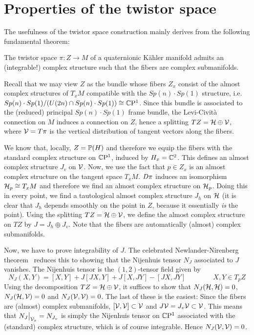 \section{Properties of the twistor space}

The usefulness of the twistor space construction mainly derives from the following fundamental theorem:

\begin{thm}\label{thm:twistorcpx}
	The twistor space $\pi: Z\to M$ of a quaternionic K\"ahler manifold admits an (integrable!) complex structure such that the fibers are complex submanifolds.
\end{thm}
\begin{myproof}
	Recall that we may view $Z$ as the bundle whose fibers $Z_x$ consist of the almost complex structures of $T_xM$ compatible with the $Sp(n)\cdot Sp(1)$ structure, i.e.~$Sp(n)\cdot Sp(1)/(U(2n)\cap Sp(n)\cdot Sp(1))\cong \CP^1$. Since this bundle is associated to the (reduced) principal $Sp(n)\cdot Sp(1)$ frame bundle, the Levi-Civit\`a connection on $M$ induces a connection on $Z$, hence a splitting $TZ=\mc H\oplus \mc V$, where $\mc V=T\pi$ is the vertical distribution of tangent vectors along the fibers. 
	
	We know that, locally, $Z=\P(H)$ and therefore we equip the fibers with the standard complex structure on $\CP^1$, induced by $H_x=\C^2$. This defines an almost complex structure $J_v$ on $\mc V$. Now, we use the fact that $p\in Z_x$ is an almost complex structure on the tangent space $T_xM$. $\dif\pi$ induces an isomorphism $\mc H_p\cong T_xM$ and therefore we find an almost complex structure on $\mc H_p$. Doing this in every point, we find a tautological almost complex structure $J_h$ on $\mc H$ (it is clear that $J_h$ depends smoothly on the point in $Z$, because it essentially \emph{is} the point). Using the splitting $TZ=\mc H\oplus \mc V$, we define the almost complex structure on $TZ$ by $J=J_h\oplus J_v$. Note that the fibers are automatically (almost) complex submanifolds.
	
	Now, we have to prove integrability of $J$. The celebrated Newlander-Nirenberg theorem~\cite{NN1957} reduces this to showing that the Nijenhuis tensor $N_J$ associated to $J$ vanishes. The Nijenhuis tensor is the $(1,2)$-tensor field given by
	\begin{equation*}
		N_J(X,Y)=[X,Y]+J[JX,Y]+J[X,JY]-[JX,JY] \qquad \qquad X,Y\in T_pZ
	\end{equation*}
	Using the decomposition $TZ=\mc H\oplus \mc V$, it suffices to show that $N_J(\mc H,\mc H)=0$, $N_J(\mc H,\mc V)=0$ and $N_J(\mc V,\mc V)=0$. The last of these is the easiest: Since the fibers are (almost) complex submanifolds, $[\mc V,\mc V]\subset \mc V$ and $J\mc V=J_v\mc V\subset \mc V$. This means that $N_J\big|_{\mc{V}_x}=N_{J_v}$ is simply the Nijenhuis tensor on $\CP^1$ associated with the (standard) complex structure, which is of course integrable. Hence $N_J(\mc V,\mc V)=0$. 
	

\end{myproof}
